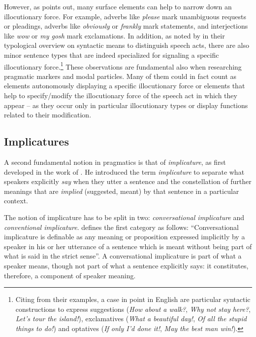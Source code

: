 However, as \citet[214]{Levinson2017} points out, many surface elements can help to narrow down an illocutionary force. For example, adverbs like \textit{please} mark unambiguous requests or pleadings, adverbs like \textit{obviously} or \textit{frankly} mark statements, and interjections like \textit{wow} or \textit{my gosh} mark exclamations. In addition, as noted by \citet{SadockZwicky1985} in their typological overview on syntactic means to distinguish speech acts, there are also minor sentence types that are indeed specialized for signaling a specific illocutionary force.\footnote{Citing from their examples, a case in point in English are particular syntactic constructions to express suggestions (\textit{How about a walk?}, \textit{Why not stay here?}, \textit{Let’s tour the island!}), exclamatives (\textit{What a beautiful day!}, \textit{Of all the stupid things to do!}) and optatives (\textit{If only I’d done it!}, \textit{May the best man win!}).} These observations are fundamental also when researching pragmatic markers and modal particles. Many of them could in fact count as elements autonomously displaying a specific illocutionary force \citep[75]{Austin1962} or elements that help to specify/modify the illocutionary force of the speech act in which they appear – as they occur only in particular illocutionary types or display functions related to their modification.

\subsection{Implicatures}
\hypertarget{Toc124860617}{}
A second fundamental notion in pragmatics is that of \textit{implicature}, as first developed in the work of \citet{Grice1975}. He introduced the term \textit{implicature} to separate what speakers explicitly \textit{say} when they utter a sentence and the constellation of further meanings that are \textit{implied} (suggested, meant) by that sentence in a particular context.

The notion of implicature has to be split in two: \textit{conversational implicature} and \textit{conventional implicature}. \citet[156]{Huang2017} defines the first category as follows: “Conversational implicature is definable as any meaning or proposition expressed implicitly by a speaker in his or her utterance of a sentence which is meant without being part of what is said in the strict sense”. A conversational implicature is part of what a speaker means, though not part of what a sentence explicitly says: it constitutes, therefore, a component of speaker meaning.

